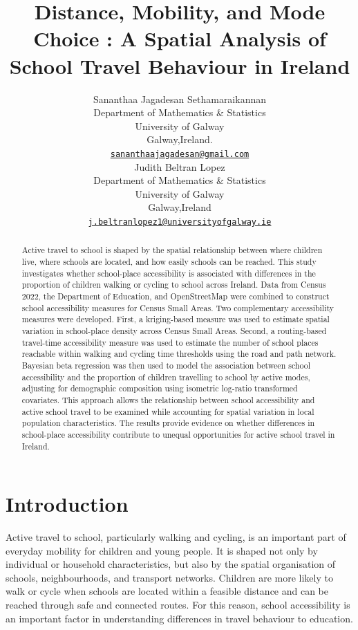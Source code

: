 \documentclass{article}
\title{Distance, Mobility, and Mode Choice : A Spatial Analysis of
School Travel Behaviour in Ireland}
\author{
    Sananthaa Jagadesan Sethamaraikannan
   \\
    Department of Mathematics \& Statistics \\
    University of Galway \\
  Galway,Ireland. \\
  \texttt{\href{mailto:sananthaajagadesan@gmail.com}{\nolinkurl{sananthaajagadesan@gmail.com}}} \\
   \And
    Judith Beltran Lopez
   \\
    Department of Mathematics \& Statistics \\
    University of Galway \\
  Galway,Ireland \\
  \texttt{\href{mailto:j.beltranlopez1@universityofgalway.ie}{\nolinkurl{j.beltranlopez1@universityofgalway.ie}}} \\
  }
\begin{document}
\maketitle


\begin{abstract}
Active travel to school is shaped by the spatial relationship between
where children live, where schools are located, and how easily schools
can be reached. This study investigates whether school-place
accessibility is associated with differences in the proportion of
children walking or cycling to school across Ireland. Data from Census
2022, the Department of Education, and OpenStreetMap were combined to
construct school accessibility measures for Census Small Areas. Two
complementary accessibility measures were developed. First, a
kriging-based measure was used to estimate spatial variation in
school-place density across Census Small Areas. Second, a routing-based
travel-time accessibility measure was used to estimate the number of
school places reachable within walking and cycling time thresholds using
the road and path network. Bayesian beta regression was then used to
model the association between school accessibility and the proportion of
children travelling to school by active modes, adjusting for demographic
composition using isometric log-ratio transformed covariates. This
approach allows the relationship between school accessibility and active
school travel to be examined while accounting for spatial variation in
local population characteristics. The results provide evidence on
whether differences in school-place accessibility contribute to unequal
opportunities for active school travel in Ireland.
\end{abstract}


\section{Introduction}\label{introduction}

Active travel to school, particularly walking and cycling, is an
important part of everyday mobility for children and young people. It is
shaped not only by individual or household characteristics, but also by
the spatial organisation of schools, neighbourhoods, and transport
networks. Children are more likely to walk or cycle when schools are
located within a feasible distance and can be reached through safe and
connected routes. For this reason, school accessibility is an important
factor in understanding differences in travel behaviour to education.
\end{document}
